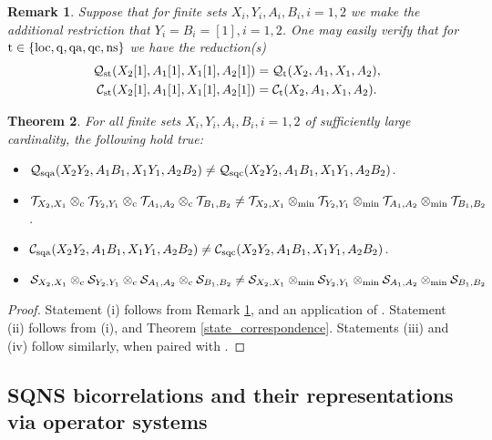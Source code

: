 \documentclass[11pt]{amsart}
\newtheorem{theorem}{Theorem}[section]
\newtheorem{remark}[theorem]{Remark}
\newcommand{\cl}[1]{\mathcal{#1}}
\begin{document}
 \begin{remark}\label{reduction_remark}
\rm Suppose that for finite sets $X_{i}, Y_{i}, A_{i}, B_{i}, i = 1, 2$ we make the additional restriction that $Y_{i} = B_{i} = [1], i = 1, 2$. One may easily verify that for ${\rm t} \in \{\rm loc, q, qa, qc, ns\}$ we have the reduction(s)
\begin{gather*}
	\cl{Q}_{\rm st}(X_{2}[1], A_{1}[1], X_{1}[1], A_{2}[1]) = \cl{Q}_{\rm t}(X_{2}, A_{1}, X_{1}, A_{2}),
\\	\cl{C}_{\rm st}(X_{2}[1], A_{1}[1], X_{1}[1], A_{2}[1]) = \cl{C}_{\rm t}(X_{2}, A_{1}, X_{1}, A_{2}).
\end{gather*}
\end{remark}
\begin{theorem}
For all finite sets $X_{i}, Y_{i}, A_{i}, B_{i}, i = 1, 2$ of sufficiently large cardinality, the following hold true:
\begin{itemize}
	\item[(i)] $\cl{Q}_{\rm sqa}(X_{2}Y_{2}, A_{1}B_{1}, X_{1}Y_{1}, A_{2}B_{2}) \neq \cl{Q}_{\rm sqc}(X_{2}Y_{2}, A_{1}B_{1}, X_{1}Y_{1}, A_{2}B_{2})$.
	\item[(ii)] $\cl{T}_{X_{2}, X_{1}}\otimes_{\rm c} \cl{T}_{Y_{2}, Y_{1}}\otimes_{\rm c} \cl{T}_{A_{1}, A_{2}}\otimes_{\rm c} \cl{T}_{B_{1}, B_{2}} \neq \cl{T}_{X_{2}, X_{1}}\otimes_{\rm min}\cl{T}_{Y_{2}, Y_{1}}\otimes_{\rm min} \cl{T}_{A_{1}, A_{2}}\otimes_{\rm min}\cl{T}_{B_{1}, B_{2}}$. 
	\item[(iii)] $\cl{C}_{\rm sqa}(X_{2}Y_{2}, A_{1}B_{1}, X_{1}Y_{1}, A_{2}B_{2}) \neq \cl{C}_{\rm sqc}(X_{2}Y_{2}, A_{1}B_{1}, X_{1}Y_{1}, A_{2}B_{2})$.
	\item[(iv)] $\cl{S}_{X_{2}, X_{1}}\otimes_{\rm c} \cl{S}_{Y_{2}, Y_{1}}\otimes_{\rm c} \cl{S}_{A_{1}, A_{2}}\otimes_{\rm c} \cl{S}_{B_{1}, B_{2}} \neq \cl{S}_{X_{2}, X_{1}}\otimes_{\rm min}\cl{S}_{Y_{2}, Y_{1}}\otimes_{\rm min} \cl{S}_{A_{1}, A_{2}}\otimes_{\rm min}\cl{S}_{B_{1}, B_{2}}$
\end{itemize}
\end{theorem}
\begin{proof}
Statement (i) follows from Remark \ref{reduction_remark}, and an application of \cite[Theorem 8.3]{tt}. Statement (ii) follows from (i), and Theorem \ref{state_correspondence}. Statements (iii) and (iv) follow similarly, when paired with \cite[Remark 8.1]{tt}.
\end{proof}

\subsection{SQNS bicorrelations and their representations via operator systems} 
\end{document}
